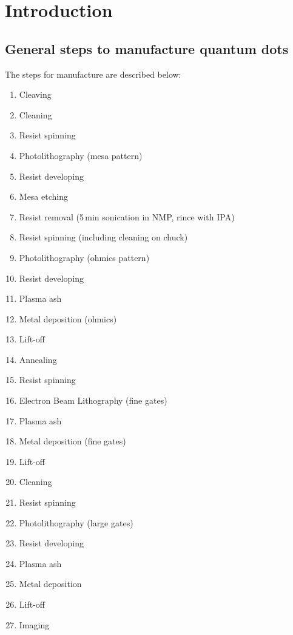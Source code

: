 \section{Introduction}

\subsection{General steps to manufacture quantum dots}

The steps for manufacture are described below:\\

\begin{enumerate}[noitemsep]
\item Cleaving
\item Cleaning
\item Resist spinning
\item Photolithography (mesa pattern)
\item Resist developing
\item Mesa etching
\item Resist removal (5\,min sonication in NMP, rince with IPA)
\item Resist spinning (including cleaning on chuck)
\item Photolithography (ohmics pattern)
\item Resist developing
\item Plasma ash
\item Metal deposition (ohmics)
\item Lift-off
\item Annealing
\item Resist spinning
\item Electron Beam Lithography (fine gates)
\item Plasma ash
\item Metal deposition (fine gates)
\item Lift-off
\item Cleaning
\item Resist spinning
\item Photolithography (large gates)
\item Resist developing
\item Plasma ash
\item Metal deposition
\item Lift-off
\item Imaging
\end{enumerate}

\newpage

